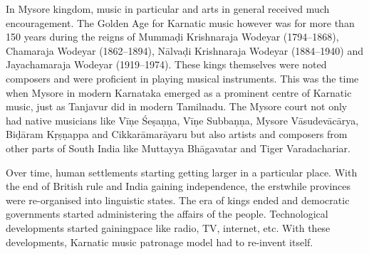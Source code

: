 In Mysore kingdom, music in particular and arts in general received much encouragement. The Golden Age for Karnatic music however was for more than 150 years during the reigns of Mummaḍi Krishnaraja Wodeyar (1794–1868), Chamaraja Wodeyar (1862–1894), Nālvaḍi Krishnaraja Wodeyar (1884–1940) and Jayachamaraja Wodeyar (1919–1974). These kings themselves were noted composers and were proficient in playing musical instruments. This was the time when Mysore in modern Karnataka emerged as a prominent centre of Karnatic music, just as Tanjavur did in modern Tamilnadu. The Mysore court not only had native musicians like Vīṇe Śeṣaṇṇa, Vīṇe Subbaṇṇa, Mysore Vāsudevācārya, Biḍāram Kṛṣṇappa and Cikkarāmarāyaru but also arti\-sts and composers from other parts of South India like Muttayya Bhāgavatar and Tiger Varadachariar.


Over time, human settlements starting getting larger in a particular place. With the end of British rule and India gaining independence, the erstwhile provinces were re-organised into linguistic states. The era of kings ended and democratic governments started administering the affairs of the people. Technological developments started gaining\newpage pace like radio, TV, internet, etc. With these developments, Karnatic music patronage model had to re-invent itself.

